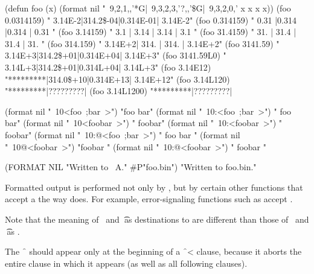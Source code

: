 \code
 (defun foo (x)
   (format nil "~9,2,1,,'*G|~9,3,2,3,'?,,'\$G|~9,3,2,0,'%
          x x x x))                                     
 (foo 0.0314159) \EV "  3.14E-2|314.2\$-04|0.314E-01|  3.14E-2"
 (foo 0.314159)  \EV "  0.31   |0.314    |0.314    | 0.31    "
 (foo 3.14159)   \EV "   3.1   | 3.14    | 3.14    |  3.1    "
 (foo 31.4159)   \EV "   31.   | 31.4    | 31.4    |  31.    "
 (foo 314.159)   \EV "  3.14E+2| 314.    | 314.    |  3.14E+2"
 (foo 3141.59)   \EV "  3.14E+3|314.2\$+01|0.314E+04|  3.14E+3"
 (foo 3141.59L0) \EV "  3.14L+3|314.2\$+01|0.314L+04|  3.14L+3"
 (foo 3.14E12)   \EV "*********|314.0\$+10|0.314E+13| 3.14E+12"
 (foo 3.14L120)  \EV "*********|?????????|%
 (foo 3.14L1200) \EV "*********|?????????|%
\endcode

\code
 (format nil "~10<foo~;bar~>")   \EV "foo    bar"
 (format nil "~10:<foo~;bar~>")  \EV "  foo  bar"
 (format nil "~10<foobar~>")     \EV "    foobar"
 (format nil "~10:<foobar~>")    \EV "    foobar"
 (format nil "~10:@<foo~;bar~>") \EV "  foo bar "
 (format nil "~10@<foobar~>")    \EV "foobar    "
 (format nil "~10:@<foobar~>")   \EV "  foobar  "
\endcode

\code
  (FORMAT NIL "Written to ~A." #P"foo.bin")
  \EV "Written to foo.bin."
\endcode
{}

\endsubsection%


Formatted output is performed not only by ,
but by certain other functions that accept a 
the way  does.  For example, error-signaling functions
such as  accept .

Note that the meaning of \nil\ and \t\ as destinations to  
are different than those of \nil\ and \t\ as .

The \f{~\hat } should appear only at the beginning of a \f{~<} clause,
because it aborts the entire clause in which it appears (as well as
all following clauses).                                     

\endsubsection%
